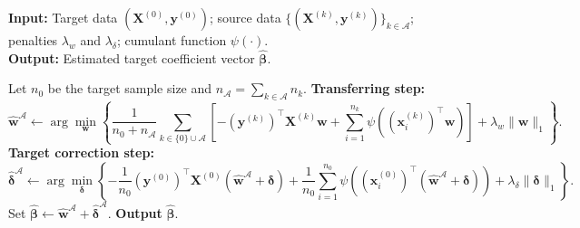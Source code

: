 \begin{algorithm}[H]
\footnotesize
\caption{$\mathcal{A}$-Trans-GLM}
\label{alg:atransglm}
\textbf{Input:} Target data $(\bm{X}^{(0)},\bm{y}^{(0)})$; source data $\{(\bm{X}^{(k)},\bm{y}^{(k)})\}_{k\in\mathcal{A}}$;
penalties $\lambda_w$ and $\lambda_\delta$; cumulant function $\psi(\cdot)$.\\
\textbf{Output:} Estimated target coefficient vector $\hat{\bm{\beta}}$.
\begin{algorithmic}[1]
\State Let $n_0$ be the target sample size and $n_{\mathcal{A}}=\sum_{k\in\mathcal{A}} n_k$.
\State \textbf{Transferring step:}
\[
\hat{\bm{w}}^{\mathcal{A}} \leftarrow \arg\min_{\bm{w}}
\left\{
\frac{1}{n_0+n_{\mathcal{A}}}\sum_{k\in\{0\}\cup\mathcal{A}}
\left[-(\bm{y}^{(k)})^\top \bm{X}^{(k)} \bm{w}+\sum_{i=1}^{n_k}\psi\!\left((\bm{x}^{(k)}_i)^\top \bm{w}\right)\right]
+\lambda_w\|\bm{w}\|_1
\right\}.
\]
\State \textbf{Target correction step:}
\[
\hat{\bm{\delta}}^{\mathcal{A}} \leftarrow \arg\min_{\bm{\delta}}
\left\{
-\frac{1}{n_0}(\bm{y}^{(0)})^\top \bm{X}^{(0)}(\hat{\bm{w}}^{\mathcal{A}}+\bm{\delta})
+\frac{1}{n_0}\sum_{i=1}^{n_0}\psi\!\left((\bm{x}^{(0)}_i)^\top (\hat{\bm{w}}^{\mathcal{A}}+\bm{\delta})\right)
+\lambda_\delta\|\bm{\delta}\|_1
\right\}.
\]
\State Set $\hat{\bm{\beta}}\leftarrow \hat{\bm{w}}^{\mathcal{A}}+\hat{\bm{\delta}}^{\mathcal{A}}$.
\State \textbf{Output} $\hat{\bm{\beta}}$.
\end{algorithmic}
\end{algorithm}

\newpage

